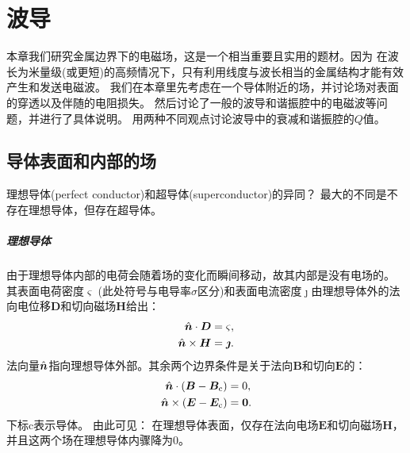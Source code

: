 \chapter{波导}
\label{chap:waveguide}
本章我们研究金属边界下的电磁场，这是一个相当重要且实用的题材。因为
在波长为米量级(或更短)的高频情况下，只有利用线度与波长相当的金属结构才能有效产生和发送电磁波。
我们在本章里先考虑在一个导体附近的场，并讨论场对表面的穿透以及伴随的电阻损失。
然后讨论了一般的波导和谐振腔中的电磁波等问题，并进行了具体说明。
用两种不同观点讨论波导中的衰减和谐振腔的$Q$值。

\section{导体表面和内部的场}
理想导体(perfect conductor)和超导体(superconductor)的异同？
最大的不同是不存在理想导体，但存在超导体。

\paragraph{理想导体}


由于理想导体内部的电荷会随着场的变化而瞬间移动，故其内部是没有电场的。
其表面电荷密度$\varsigma$ (此处符号与电导率$\sigma$区分)和表面电流密度$\bm\jmath$由理想导体外的法向电位移$\bm D$和切向磁场$\bm H$给出：
\begin{subequations}
    \begin{align}
        \hat{\bm{n}}\cdot\bm D&=\varsigma,\\
        \label{eqn:nxH=j}
        \hat{\bm{n}}\times\bm H&=\bm\jmath.
    \end{align}
\end{subequations}
法向量$\hat{\bm{n}}$指向理想导体外部。其余两个边界条件是关于法向$\bm B$和切向$\bm E$的：
\begin{subequations}
    \begin{align}
        \hat{\bm{n}}\cdot(\bm B-\bm B_\text c)&=0,\\
        \hat{\bm{n}}\times(\bm E-\bm E_\text c)&=\bm 0.
    \end{align}
\end{subequations}
下标c表示导体。
由此可见：
在理想导体表面，仅存在法向电场$\bm E$和切向磁场$\bm H$，并且这两个场在理想导体内骤降为0。

